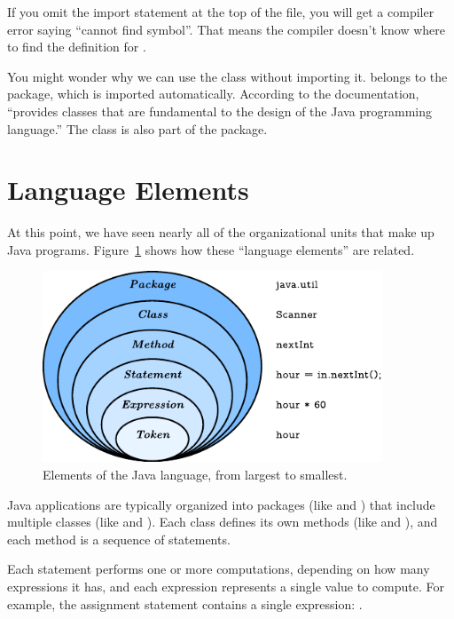If you omit the import statement at the top of the file, you will get a compiler error saying ``cannot find symbol''.
That means the compiler doesn't know where to find the definition for .


You might wonder why we can use the  class without importing it.
 belongs to the  package, which is imported automatically.
According to the documentation,  ``provides classes that are fundamental to the design of the Java programming language.''
The  class is also part of the  package.


\section{Language Elements}


At this point, we have seen nearly all of the organizational units that make up Java programs.
Figure~\ref{fig.package} shows how these ``language elements'' are related.

\begin{figure}[!ht]
\begin{center}
\includegraphics[width=4in]{figs/package.pdf}
\caption{Elements of the Java language, from largest to smallest.}
\label{fig.package}
\end{center}
\end{figure}


Java applications are typically organized into packages (like  and ) that include multiple classes (like  and ).
Each class defines its own methods (like  and ), and each method is a sequence of statements.

Each statement performs one or more computations, depending on how many expressions it has, and each expression represents a single value to compute.
For example, the assignment statement  contains a single expression: .

